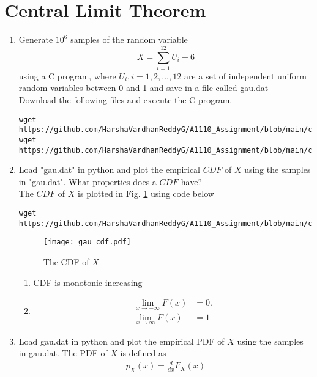 \documentclass[journal,12pt,twocolumn]{IEEEtran}
\renewcommand\thesection{\arabic{section}}
\begin{document}
\section{Central Limit Theorem}
\begin{enumerate}[label=\thesection.\arabic*
,ref=\thesection.\theenumi]
\item Generate $10^6$ samples of the random variable
%
\begin{equation}
X = \sum_{i=1}^{12}U_i -6
\end{equation}
%
using a C program, where $U_i, i = 1,2,\dots, 12$ are  a set of independent uniform random variables between 0 and 1
and save in a file called gau.dat\\
\solution Download the following files and execute the  C program.
\begin{lstlisting}
wget https://github.com/HarshaVardhanReddyG/A1110_Assignment/blob/main/codes/exrand_gaussian.c
wget https://github.com/HarshaVardhanReddyG/A1110_Assignment/blob/main/codes/coeffs.h
\end{lstlisting}
\item Load "gau.dat" in python and plot the empirical $CDF$ of $X$ using the samples in "gau.dat". What properties does a $CDF$ have?\\
\solution
The $CDF$ of $X$ is plotted in Fig. \ref{fig:gauss_cdf} using code below
\begin{lstlisting}
wget https://github.com/HarshaVardhanReddyG/A1110_Assignment/blob/main/codes/cdf_gau_plot.py
\end{lstlisting}
\begin{figure}[ht!]
\centering
\texttt{[image: gau\_cdf.pdf]}
\caption{The CDF of $X$}
\centering
\label{fig:gauss_cdf}
\end{figure}
\begin{enumerate}
    \item CDF is monotonic increasing
    \item 
    \begin{align}
        \lim _{x \to -\infty}F(x) &=0.\\
        \lim_{x\to \infty} F(x) &=1
    \end{align}
\end{enumerate}
\item
Load gau.dat in python and plot the empirical PDF of $X$ using the samples in gau.dat. The PDF of $X$ is defined as
\begin{align}
p_{X}(x) = \frac{d}{dx}F_{X}(x)
\end{align}

\end{enumerate}
\end{document}
